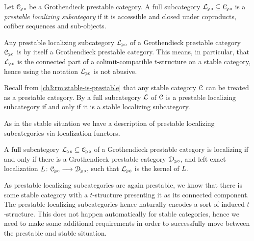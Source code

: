 \begin{definition}
    Let $\EuScript{C}_{\hspace{-1pt}\scriptscriptstyle\geqslant 0}$ be a Grothendieck prestable category. A full subcategory $\mathcal{L}_{\hspace{-1pt}\scriptscriptstyle\geqslant 0}\subseteq \EuScript{C}_{\hspace{-1pt}\scriptscriptstyle\geqslant 0}$ is a \emph{prestable localizing subcategory} if it is accessible and closed under coproducts, cofiber sequences and sub-objects. 
\end{definition}

\begin{remark}
    \label{ch3:rm:prestable-localizing-is-Grothendieck}
    Any prestable localizing subcategory $\mathcal{L}_{\hspace{-1pt}\scriptscriptstyle\geqslant 0}$ of a Grothendieck prestable category $\EuScript{C}_{\hspace{-1pt}\scriptscriptstyle\geqslant 0}$ is by \cite[C.5.2.1]{lurie_SAG} itself a Grothendieck prestable category. This means, in particular, that $\mathcal{L}_{\hspace{-1pt}\scriptscriptstyle\geqslant 0}$ is the connected part of a colimit-compatible $t$-structure on a stable category, hence using the notation $\mathcal{L}_{\hspace{-1pt}\scriptscriptstyle\geqslant 0}$ is not abusive. 
\end{remark}

\begin{remark}
    \label{ch3:rm:prestable-localizing-in-stable-then-stable-localizing}
    Recall from \cref{ch3:rm:stable-is-prestable} that any stable category $\EuScript{C}$ can be treated as a prestable category. By \cite[C.2.3.6]{lurie_SAG} a full subcategory $\mathcal{L}$ of $\EuScript{C}$ is a prestable localizing subcategory if and only if it is a stable localizing subcategory. 
\end{remark}

As in the stable situation we have a description of prestable localizing subcategories via localization functors. 

\begin{proposition}
    \label{ch3:prop:Lurie-prestable-localizing-left-exact-functor}
    A full subcategory $\mathcal{L}_{\hspace{-1pt}\scriptscriptstyle\geqslant 0}\subseteq \EuScript{C}_{\hspace{-1pt}\scriptscriptstyle\geqslant 0}$ of a Grothendieck prestable category is localizing if and only if there is a Grothendieck prestable category $\EuScript{D}_{\hspace{-1pt}\scriptscriptstyle\geqslant 0}$, and left exact localization $L\colon\EuScript{C}_{\hspace{-1pt}\scriptscriptstyle\geqslant 0}\longrightarrow\EuScript{D}_{\hspace{-1pt}\scriptscriptstyle\geqslant 0}$, such that $\mathcal{L}_{\hspace{-1pt}\scriptscriptstyle\geqslant 0}$ is the kernel of $L$. 
\end{proposition}















As prestable localizing subcategories are again prestable, we know that there is some stable category with a $t$-structure presenting it as its connected component. The prestable localizing subcategories hence naturally encodes a sort of induced $t$-structure. This does not happen automatically for stable categories, hence we need to make some additional requirements in order to successfully move between the prestable and stable situation. 

